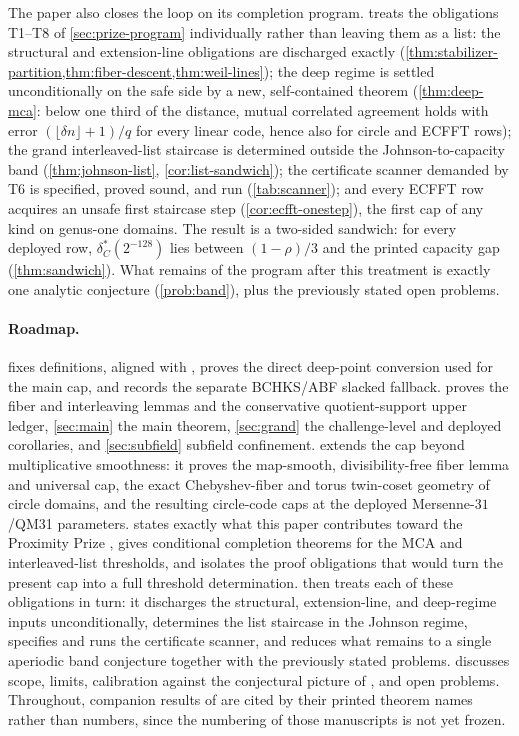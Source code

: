 \documentclass[11pt]{article}
\theoremstyle{definition}
\theoremstyle{remark}
\begin{document}
The paper also closes the loop on its completion program.  treats the obligations T1--T8 of \cref{sec:prize-program} individually rather than leaving them as a list: the structural and extension-line obligations are discharged exactly (\cref{thm:stabilizer-partition,thm:fiber-descent,thm:weil-lines}); the deep regime is settled unconditionally on the safe side by a new, self-contained theorem (\cref{thm:deep-mca}: below one third of the distance, mutual correlated agreement holds with error $(\lfloor\delta n\rfloor+1)/q$ for every linear code, hence also for circle and ECFFT rows); the grand interleaved-list staircase is determined outside the Johnson-to-capacity band (\cref{thm:johnson-list}, \cref{cor:list-sandwich}); the certificate scanner demanded by T6 is specified, proved sound, and run (\cref{tab:scanner}); and every ECFFT row acquires an unsafe first staircase step (\cref{cor:ecfft-onestep}), the first cap of any kind on genus-one domains. The result is a two-sided sandwich: for every deployed row, $\delta^*_C(2^{-128})$ lies between $(1-\rho)/3$ and the printed capacity gap (\cref{thm:sandwich}). What remains of the program after this treatment is exactly one analytic conjecture (\cref{prob:band}), plus the previously stated open problems.

\paragraph{Roadmap.}  fixes definitions, aligned with \cite[Defs.~4.1, 4.3]{ABF26}, proves the direct deep-point conversion used for the main cap, and records the separate BCHKS/ABF slacked fallback.  proves the fiber and interleaving lemmas and the conservative quotient-support upper ledger, \cref{sec:main} the main theorem, \cref{sec:grand} the challenge-level and deployed corollaries, and \cref{sec:subfield} subfield confinement.  extends the cap beyond multiplicative smoothness: it proves the map-smooth, divisibility-free fiber lemma and universal cap, the exact Chebyshev-fiber and torus twin-coset geometry of circle domains, and the resulting circle-code caps at the deployed Mersenne-$31$/QM31 parameters.  states exactly what this paper contributes toward the Proximity Prize \cite{ProximityPrize}, gives conditional completion theorems for the MCA and interleaved-list thresholds, and isolates the proof obligations that would turn the present cap into a full threshold determination.  then treats each of these obligations in turn: it discharges the structural, extension-line, and deep-regime inputs unconditionally, determines the list staircase in the Johnson regime, specifies and runs the certificate scanner, and reduces what remains to a single aperiodic band conjecture together with the previously stated problems.  discusses scope, limits, calibration against the conjectural picture of \cite{Cho26b}, and open problems. Throughout, companion results of \cite{Cho26a,Cho26b} are cited by their printed theorem names rather than numbers, since the numbering of those manuscripts is not yet frozen.
\end{document}
